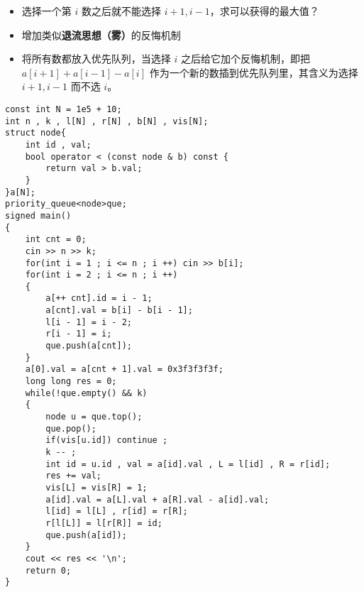 \documentclass[C:/Users/12748/Desktop/latex模板/main/main.tex]{subfiles}
\begin{document}
\begin{itemize}
\item
  选择一个第 \(i\) 数之后就不能选择 \(i+1,i-1\)，求可以获得的最大值？
\item
  增加类似\textbf{退流思想（雾）}的反悔机制
\item
  将所有数都放入优先队列，当选择 \(i\) 之后给它加个反悔机制，即把
  \(a[i+1]+a[i-1] - a[i]\) 作为一个新的数插到优先队列里，其含义为选择
  \(i+1,i-1\) 而不选 \(i\)。
\end{itemize}

\begin{lstlisting}
const int N = 1e5 + 10;
int n , k , l[N] , r[N] , b[N] , vis[N];
struct node{
	int id , val;
	bool operator < (const node & b) const {
		return val > b.val;
	}
}a[N];
priority_queue<node>que;
signed main()
{
	int cnt = 0;
	cin >> n >> k;
	for(int i = 1 ; i <= n ; i ++) cin >> b[i];
	for(int i = 2 ; i <= n ; i ++)
	{
		a[++ cnt].id = i - 1;
		a[cnt].val = b[i] - b[i - 1];
		l[i - 1] = i - 2;
		r[i - 1] = i;
		que.push(a[cnt]);
	}
	a[0].val = a[cnt + 1].val = 0x3f3f3f3f;
	long long res = 0;
	while(!que.empty() && k)
	{
		node u = que.top();
		que.pop();
		if(vis[u.id]) continue ;
		k -- ;
		int id = u.id , val = a[id].val , L = l[id] , R = r[id];
		res += val;
		vis[L] = vis[R] = 1;
		a[id].val = a[L].val + a[R].val - a[id].val;
		l[id] = l[L] , r[id] = r[R];
		r[l[L]] = l[r[R]] = id; 
		que.push(a[id]);
	}
	cout << res << '\n';
	return 0;
}
\end{lstlisting}
\end{document}
